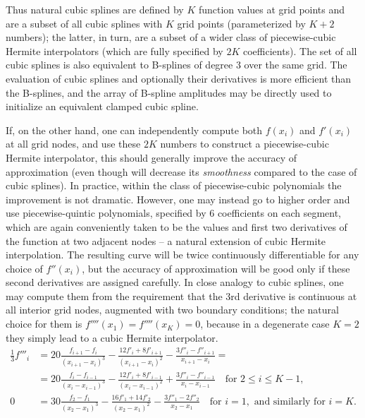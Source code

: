 \documentclass[12pt]{article}
\begin{document}
Thus natural cubic splines are defined by $K$ function values at grid points and are a subset of all cubic splines with $K$ grid points (parameterized by $K+2$ numbers); the latter, in turn, are a subset of a wider class of piecewise-cubic Hermite interpolators (which are fully specified by $2K$ coefficients). The set of all cubic splines is also equivalent to B-splines of degree 3 over the same grid. The evaluation of cubic splines and optionally their derivatives is more efficient than the B-splines, and the array of B-spline amplitudes may be directly used to initialize an equivalent clamped cubic spline.

If, on the other hand, one can independently compute both $f(x_i)$ and $f'(x_i)$ at all grid nodes, and use these $2K$ numbers to construct a piecewise-cubic Hermite interpolator, this should generally improve the accuracy of approximation (even though will decrease its \textit{smoothness} compared to the case of cubic splines). In practice, within the class of piecewise-cubic polynomials the improvement is not dramatic. However, one may instead go to higher order and use piecewise-quintic polynomials, specified by 6 coefficients on each segment, which are again conveniently taken to be the values and first two derivatives of the function at two adjacent nodes -- a natural extension of cubic Hermite interpolation. The resulting curve will be twice continuously differentiable for any choice of $f''(x_i)$, but the accuracy of approximation will be good only if these second derivatives are assigned carefully. In close analogy to cubic splines, one may compute them from the requirement that the 3rd derivative is continuous at all interior grid nodes, augmented with two boundary conditions; the natural choice for them is $f''''(x_1)=f''''(x_K)=0$, because in a degenerate case $K=2$ they simply lead to a cubic Hermite interpolator.
\begin{subequations}
\begin{align}
\frac{1}{3} f'''_i
&= 20 \frac{f_{i+1}-f_i}{(x_{i+1}-x_i)^3} - \frac{12f'_i+8f'_{i+1}}{(x_{i+1}-x_i)^2} - \frac{3f''_i-f''_{i+1}}{x_{i+1}-x_i} = \\
&= 20 \frac{f_i-f_{i-1}}{(x_i-x_{i-1})^3} - \frac{12f'_i+8f'_{i-1}}{(x_i-x_{i-1})^2} + \frac{3f''_i-f''_{i-1}}{x_i-x_{i-1}}\quad \mbox{for }2\le i \le K-1, \nonumber \\
0 &= 30\frac{f_2-f_1}{(x_2-x_1)^3} - \frac{16f'_1+14f'_2}{(x_2-x_1)^2} - \frac{3f''_1-2f''_2}{x_2-x_1} \quad\mbox{for }i=1,\mbox{ and similarly for }i=K.
\end{align}
\end{subequations}
\end{document}
